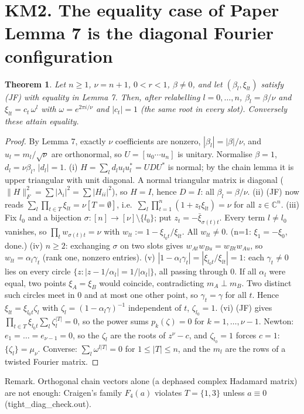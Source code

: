 \documentclass[11pt]{article}
\newtheorem{theorem}{Theorem}\newtheorem{proposition}{Proposition}
\begin{document}
\section*{KM2. The equality case of Paper Lemma 7 is the diagonal Fourier configuration}
\begin{theorem}
Let $n\ge1$, $\nu=n+1$, $0<r<1$, $\beta\ne0$, and let $(\beta_l,\xi_{lt})$ satisfy (JF) with equality in Lemma 7. Then, after relabelling $l=0,\dots,n$,
$\beta_l=\beta/\nu$ and $\xi_{lt}=c_t\,\omega^{l}$ with $\omega=e^{2\pi i/\nu}$ and $|c_t|=1$ (the same root in every slot). Conversely these attain equality.
\end{theorem}
\begin{proof}
By Lemma 7, exactly $\nu$ coefficients are nonzero, $|\beta_l|=|\beta|/\nu$, and $u_l=m_l/\sqrt\nu$ are orthonormal, so $U=[u_0\cdots u_n]$ is unitary.
Normalise $\beta=1$, $d_l=\nu\beta_l$, $|d_l|=1$. (i) $H=\sum_ld_lu_lu_l^*=UDU^*$ is normal; by the chain lemma it is upper triangular with unit diagonal.
A normal triangular matrix is diagonal ($\|H\|_F^2=\sum|\lambda_i|^2=\sum|H_{ii}|^2$), so $H=I$, hence $D=I$: all $\beta_l=\beta/\nu$.
(ii) (JF) now reads $\sum_l\prod_{t\in T}\xi_{lt}=\nu[T=\emptyset]$, i.e.\ $\sum_l\prod_{t=1}^n(1+z_t\xi_{lt})=\nu$ for all $z\in\mathbb C^n$.
(iii) Fix $l_0$ and a bijection $\sigma:[n]\to[\nu]\setminus\{l_0\}$; put $z_t=-\bar\xi_{\sigma(t)t}$. Every term $l\ne l_0$ vanishes, so
$\prod_t w_{\sigma(t)t}=\nu$ with $w_{lt}:=1-\xi_{l_0t}/\xi_{lt}$. All $w_{lt}\neq0$. (n=1: $\xi_{1}=-\xi_{0}$, done.)
(iv) $n\ge2$: exchanging $\sigma$ on two slots gives $w_{At}w_{Bu}=w_{Bt}w_{Au}$, so $w_{lt}=\alpha_l\gamma_t$ (rank one, nonzero entries).
(v) $|1-\alpha_l\gamma_t|=|\xi_{l_0t}/\xi_{lt}|=1$: each $\gamma_t\neq0$ lies on every circle $\{z:|z-1/\alpha_l|=1/|\alpha_l|\}$, all passing through $0$.
If all $\alpha_l$ were equal, two points $\xi_A=\xi_B$ would coincide, contradicting $m_A\perp m_B$. Two distinct such circles meet in $0$ and at most one
other point, so $\gamma_t=\gamma$ for all $t$. Hence $\xi_{lt}=\xi_{l_0t}\zeta_l$ with $\zeta_l=(1-\alpha_l\gamma)^{-1}$ independent of $t$, $\zeta_{l_0}=1$.
(vi) (JF) gives $\prod_{t\in T}\xi_{l_0t}\sum_l\zeta_l^{|T|}=0$, so the power sums $p_k(\zeta)=0$ for $k=1,\dots,\nu-1$. Newton: $e_1=\dots=e_{\nu-1}=0$, so the $\zeta_l$ are the roots
of $z^\nu-c$, and $\zeta_{l_0}=1$ forces $c=1$: $\{\zeta_l\}=\mu_\nu$. Converse: $\sum_l\omega^{l|T|}=0$ for $1\le|T|\le n$, and the $m_l$ are the rows of a twisted Fourier matrix.
\end{proof}
Remark. Orthogonal chain vectors alone (a dephased complex Hadamard matrix) are not enough: Craigen's family $F_4(a)$ violates $T=\{1,3\}$ unless $a\equiv0$ (tight\_diag\_check.out).
\end{document}
